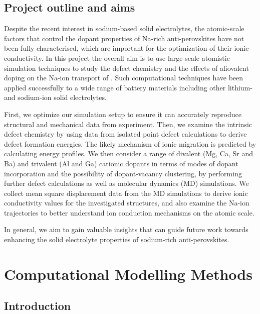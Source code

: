 \documentclass[12pt]{report}
\begin{document}
\section{Project outline and aims}

Despite the recent interest in sodium-based solid electrolytes,\cite{kim2017, zhao2018} the atomic-scale factors that control the dopant properties of Na-rich anti-perovskites have not been fully characterised, which are important for the optimization of their ionic  conductivity.
In this project the overall aim is to use large-scale atomistic simulation techniques to study the defect chemistry and the effects of aliovalent doping on the Na-ion transport of .
Such computational techniques have been applied successfully to a wide range of battery materials including other lithium- and sodium-ion solid electrolytes.\cite{symington2020, dawson2018b, deng2015, clarke2021, deng2018}

First, we optimize our simulation setup to ensure it can accurately reproduce structural and mechanical data from experiment.
Then, we examine the intrinsic defect chemistry by using data from isolated point defect calculations to derive defect formation energies. 
The likely mechanism of ionic migration is predicted by calculating energy profiles.
We then consider a range of divalent (Mg, Ca, Sr and Ba) and trivalent (Al and Ga) cationic dopants in terms of modes of dopant incorporation and the possibility of dopant-vacancy clustering, by performing further defect calculations as well as molecular dynamics (MD) simulations.
We collect mean square displacement data from the MD simulations to derive ionic conductivity values for the investigated structures, and also examine the Na-ion trajectories to better understand ion conduction mechanisms on the atomic scale.

In general, we aim to gain valuable insights that can guide future work towards enhancing the solid electrolyte properties of sodium-rich anti-perovskites.









\chapter{Computational Modelling Methods}

\section{Introduction}
\end{document}
